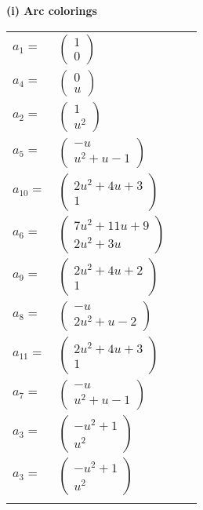 \documentclass[1p]{elsarticle_modified}
\theoremstyle{definition}
\begin{document}
\flushleft \textbf{(i) Arc colorings}\\
\begin{tabular}{m{7pt} m{180pt} m{7pt} m{180pt} }
\flushright $a_{1}=$&$\begin{pmatrix}1\\0\end{pmatrix}$ \\
\flushright $a_{4}=$&$\begin{pmatrix}0\\u\end{pmatrix}$ \\
\flushright $a_{2}=$&$\begin{pmatrix}1\\u^2\end{pmatrix}$ \\
\flushright $a_{5}=$&$\begin{pmatrix}- u\\u^2+u-1\end{pmatrix}$ \\
\flushright $a_{10}=$&$\begin{pmatrix}2 u^2+4 u+3\\1\end{pmatrix}$ \\
\flushright $a_{6}=$&$\begin{pmatrix}7 u^2+11 u+9\\2 u^2+3 u\end{pmatrix}$ \\
\flushright $a_{9}=$&$\begin{pmatrix}2 u^2+4 u+2\\1\end{pmatrix}$ \\
\flushright $a_{8}=$&$\begin{pmatrix}- u\\2 u^2+u-2\end{pmatrix}$ \\
\flushright $a_{11}=$&$\begin{pmatrix}2 u^2+4 u+3\\1\end{pmatrix}$ \\
\flushright $a_{7}=$&$\begin{pmatrix}- u\\u^2+u-1\end{pmatrix}$ \\
\flushright $a_{3}=$&$\begin{pmatrix}- u^2+1\\u^2\end{pmatrix}$\\ \flushright $a_{3}=$&$\begin{pmatrix}- u^2+1\\u^2\end{pmatrix}$\\&\end{tabular}
\end{document}
